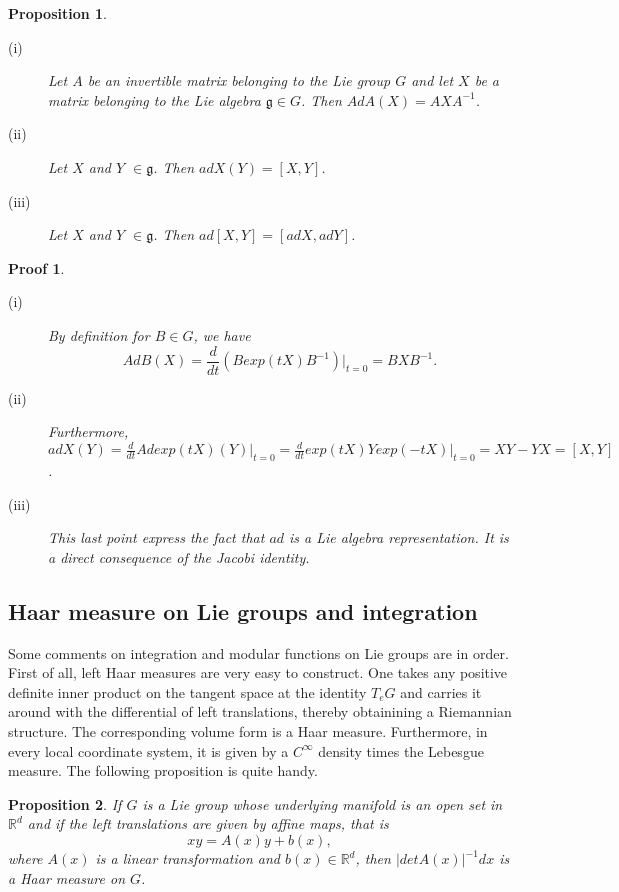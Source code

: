 \documentclass[a4paper,11pt]{article} %
\numberwithin{equation}{section} %
\numberwithin{figure}{section} %
\newtheorem{prop}{Proposition}
\newtheorem{demo}{Proof}
\begin{document}
\begin{prop} \cite[Prop. 7.8, p. 65]{Yvette2005} 
\begin{description}
\item[(i)] Let $A$ be an invertible matrix belonging to the Lie group $G$ and let $X$ be a matrix belonging to the Lie algebra $\mathfrak{g} \in G$. Then $Ad A(X) = A X A^{-1}$.
\item[(ii)] Let $X$ and $Y$ $\in \mathfrak{g}$. Then $ad X(Y) = [X,Y]$.
\item[(iii)] Let $X$ and $Y$ $\in \mathfrak{g}$. Then $ad [X,Y] = [ad X, ad Y]$.
\end{description}
\end{prop}

\begin{demo}
\begin{description}
\item[(i)] By definition for $B \in G$, we have 
\begin{equation}
Ad B(X) = \frac{d}{dt} \left( B exp(tX) B^{-1} \right) \big|_{t=0} = B X B^{-1}.
\end{equation}
\item[(ii)] Furthermore, $ad X(Y) = \frac{d}{dt} Ad exp(tX) (Y) \big|_{t=0} = \frac{d}{dt} exp(tX) Y exp(-tX) \big|_{t=0} = XY-YX = [X,Y]$. 
\item[(iii)] This last point express the fact that $ad$ is a Lie algebra representation. It is a direct consequence of the Jacobi identity.
\end{description} 
\end{demo}

\subsection{Haar measure on Lie groups and integration} \label{HaarLieInt}

Some comments on integration and modular functions on Lie groups are in order. First of all, left Haar measures are very easy to construct. One takes any positive definite inner product on the tangent space at the identity $T_eG$ and carries it around with the differential of left translations, thereby obtainining a Riemannian structure.  The corresponding volume form is a Haar measure. Furthermore, in every local coordinate system, it is given by a $C^\infty$ density times the Lebesgue measure. The following proposition is quite handy. 

\begin{prop} 
If $G$ is a Lie group whose underlying manifold is an open set in $\mathbb{R}^d$ and if the left translations are given by affine maps, that is
\begin{equation}
 xy=A(x)y+b(x),
\end{equation}
where $A(x)$ is a linear transformation and $b(x)\in\mathbb{R}^d$, then $|det A(x)|^{-1} dx$ is a Haar measure on $G$. 
\end{prop}
\end{document}
